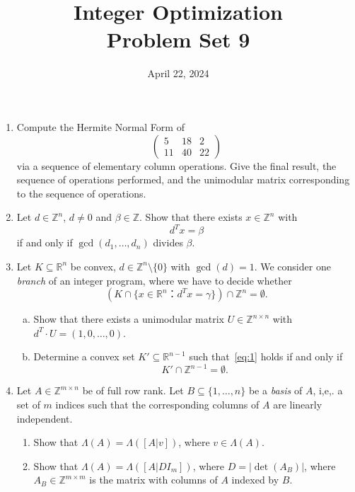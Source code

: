 \documentclass[11pt,a4paper]{article}
\title{Integer Optimization  \\ Problem Set 9 }
\date{ April 22, 2024}
\begin{document}
\maketitle 


\begin{enumerate}

  \item Compute the  Hermite Normal Form of $$ \left(\begin{matrix}
    5 & 18  & 2\\
    11 & 40 & 22
\end{matrix}\right)$$ via a sequence
of elementary column operations. Give the final result, the sequence of operations performed, and the unimodular matrix corresponding to the sequence of operations.
\item Let $d ∈ ℤ^n$, $d ≠0$ and $β ∈ ℤ$. Show that there exists $x ∈ ℤ^n$ with
  \begin{displaymath}
    d^T x = β 
  \end{displaymath}
  if and only if $\gcd(d_1,\dots,d_n)$ divides $β$. 
\item Let $K ⊆ ℝ^n$ be convex, $d ∈ℤ^n \setminus \{0\}$ with $\gcd(d) = 1$. We consider one \emph{branch} of an integer program, where we have to decide whether 
  \begin{equation}
    \label{eq:1}    
    \left(K ∩ \{ x ∈ ℝ^n ： d^T x = γ\}  \right) ∩ℤ^n = ∅ . 
  \end{equation}
  
  \begin{enumerate}[a)] 
  \item Show that there exists a unimodular matrix $U ∈ℤ^{n ×n}$ with
    $d^T ⋅ U = (1,0,\dots,0)$.
  \item Determine  a  convex set $K' ⊆ ℝ^{n-1}$ such that~\eqref{eq:1} holds if and only if
    \begin{displaymath}
      K' ∩ ℤ^{n-1} = ∅. 
    \end{displaymath}
  \end{enumerate}
\item Let $A ∈ℤ^{m ×n}$ be of full row rank. Let $B ⊆ \{1,\dots,n\}$ be a \emph{basis} of $A$, i,e,. a set of $m$ indices such that the corresponding columns of $A$ are linearly independent.
  \begin{enumerate}
  \item Show that $Λ(A) = Λ([A|v])$, where $v ∈ Λ(A)$.
  \item Show that $Λ(A) = Λ([A| D I_m])$, where $D  = |\det(A_B)|$, where $A_B∈ℤ^{m ×m}$ is the matrix with columns of $A$ indexed by $B$.
  \end{enumerate}


\end{enumerate}
\end{document}
